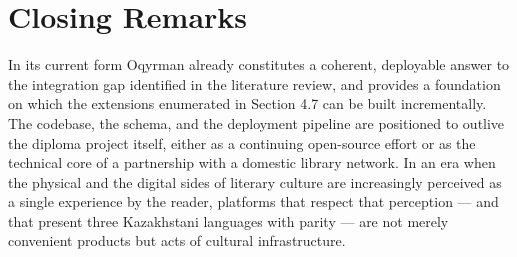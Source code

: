 \documentclass[12pt,a4paper]{report}
\begin{document}
\section{Closing Remarks}

In its current form Oqyrman already constitutes a coherent,
deployable answer to the integration gap identified in the
literature review, and provides a foundation on which the extensions
enumerated in Section 4.7 can be built incrementally. The codebase,
the schema, and the deployment pipeline are positioned to outlive the
diploma project itself, either as a continuing open-source effort or
as the technical core of a partnership with a domestic library
network. In an era when the physical and the digital sides of
literary culture are increasingly perceived as a single experience
by the reader, platforms that respect that perception --- and that
present three Kazakhstani languages with parity --- are not merely
convenient products but acts of cultural infrastructure.
\end{document}
